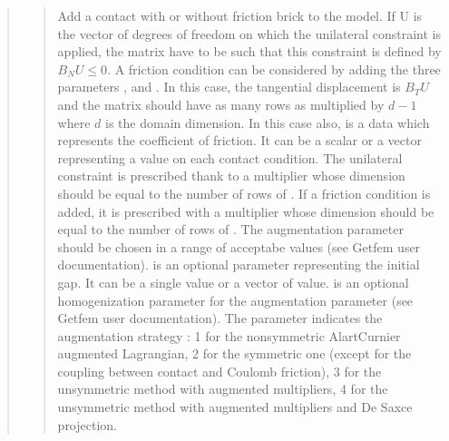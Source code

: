\documentclass[a4paper,11pt,english]{sphinxmanual}
\begin{document}
\begin{quote}
\begin{quote}
\sphinxAtStartPar
Add a contact with or without friction brick to the model.
If U is the vector
of degrees of freedom on which the unilateral constraint is applied,
the matrix  have to be such that this constraint is defined by
\(B_N U \le 0\). A friction condition can be considered by adding
the three parameters ,  and .
In this case, the tangential displacement is \(B_T U\) and
the matrix  should have as many rows as  multiplied by
\(d-1\) where \(d\) is the domain dimension.
In this case also,  is a data which represents
the coefficient of friction. It can be a scalar or a vector representing a
value on each contact condition.  The unilateral constraint is prescribed
thank to a multiplier
 whose dimension should be equal to the number of rows of
. If a friction condition is added, it is prescribed with a
multiplier  whose dimension should be equal to the number
of rows of . The augmentation parameter  should be chosen in
a range of
acceptabe values (see Getfem user documentation).  is an
optional parameter representing the initial gap. It can be a single value
or a vector of value.  is an optional homogenization
parameter for the augmentation parameter
(see Getfem user documentation).  The parameter 
indicates the augmentation strategy : 1 for the non\sphinxhyphen{}symmetric
Alart\sphinxhyphen{}Curnier augmented Lagrangian, 2 for the symmetric one (except for
the coupling between contact and Coulomb friction), 3 for the
unsymmetric method with augmented multipliers, 4 for the unsymmetric
method with augmented multipliers and De Saxce projection.
\end{quote}


\end{quote}
\end{document}
